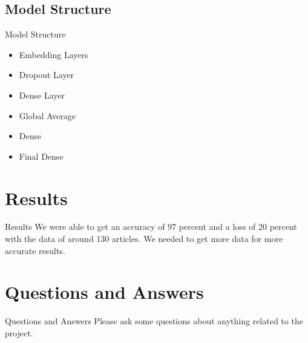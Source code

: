 \documentclass{beamer}
\begin{document}
\subsection{Model Structure}
\begin{frame}{Model Structure}
	\begin{itemize}
		\item<1-> Embedding Layers
		\item<2-> Dropout Layer
		\item<3-> Dense Layer
		\item<4-> Global Average
		\item<5-> Dense
		\item<6-> Final Dense
	\end{itemize}
\end{frame}

\section{Results}
\begin{frame}{Results}
	We were able to get an accuracy of 97 percent and a loss of 20 percent with the data of around 130 articles.
	We needed to get more data for more accurate results.
\end{frame}

\section{Questions and Answers}
\begin{frame}{Questions and Answers}
	Please ask some questions about anything related to the project.
\end{frame}
\end{document}
